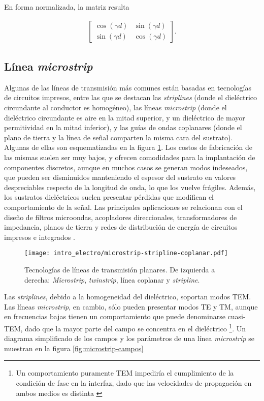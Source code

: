 En forma normalizada, la matriz resulta \cite{Pozar:MwEngineering}

\begin{align}
\label{eq:matriz_transferencia_lineaideal}
\begin{bmatrix}
\cos(\gamma d) & \sin(\gamma d) \\
\sin(\gamma d) & \cos(\gamma d)
\end{bmatrix}.
\end{align}


\subsection{Línea \textit{microstrip}}

Algunas de las líneas de transmisión más comunes están basadas en tecnologías de circuitos impresos, entre las que se destacan las \textit{striplines} (donde el dieléctrico circundante al conductor es homogéneo), las líneas \textit{microstrip} (donde el dieléctrico circundante es aire en la mitad superior, y un dieléctrico de mayor permitividad en la mitad inferior), y las guías de ondas coplanares (donde el plano de tierra y la línea de señal comparten la misma cara del sustrato). Algunas de ellas son esquematizadas en la figura \ref{fig:strip-line-technology}. Los costos de fabricación de las mismas suelen ser muy bajos, y ofrecen comodidades para la implantación de componentes discretos, aunque en muchos casos se generan modos indeseados, que pueden ser disminuidos manteniendo el espesor del sustrato en valores despreciables respecto de la longitud de onda, lo que los vuelve frágiles. Además, los sustratos dieléctricos suelen presentar pérdidas que modifican el comportamiento de la señal. Las principales aplicaciones se relacionan con el diseño de filtros microondas, acopladores direccionales, transformadores de impedancia, planos de tierra y redes de distribución de energía de circuitos impresos e integrados \cite{Venkateswaran:Thesis}.


\begin{figure}[htp]
	\centering
	\texttt{[image: intro\_electro/microstrip-stripline-coplanar.pdf]}
	\caption{Tecnologías de líneas de transmisión planares. De izquierda a derecha: \textit{Microstrip}, \textit{twinstrip}, línea coplanar y \textit{stripline}.}
	\label{fig:strip-line-technology}
\end{figure}

Las \textit{striplines}, debido a la homogeneidad del dieléctrico, soportan modos TEM. Las líneas \textit{microstrip}, en cambio, sólo pueden presentar modos TE y TM, aunque en frecuencias bajas tienen un comportamiento que puede denominarse cuasi-TEM, dado que la mayor parte del campo se concentra en el dieléctrico \footnote{Un comportamiento puramente TEM impediría el cumplimiento de la condición de fase en la interfaz, dado que las velocidades de propagación en ambos medios es distinta \cite{Pozar:MwEngineering}}. Un diagrama simplificado de los campos y los parámetros de una línea \textit{microstrip} se muestran en la figura \ref{fig:microstrip-campos}


